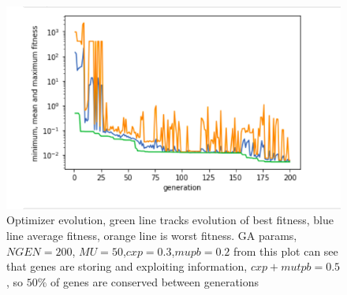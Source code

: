 \begin{figure}
    \centering
    \includegraphics[scale=0.7]{figures/optimizer_internal_validation}
    \caption{Optimizer evolution, green line tracks evolution of best fitness, blue line average fitness, orange line is worst fitness. GA params, $NGEN=200$, $MU=50$,$cxp=0.3$,$mupb=0.2$ from this plot can see that genes are storing and exploiting information, $cxp+mutpb=0.5$, so $50\%$ of genes are conserved between generations }
    \label{fig:my_label}
\end{figure}


